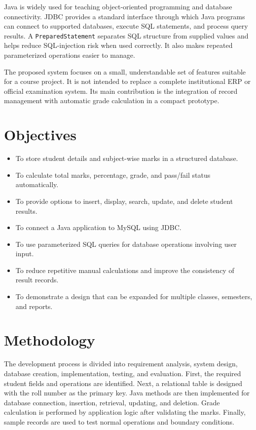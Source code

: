\documentclass[11pt,a4paper]{report}
\begin{document}
Java is widely used for teaching object-oriented programming and database connectivity. JDBC provides a standard interface through which Java programs can connect to supported databases, execute SQL statements, and process query results. A \texttt{PreparedStatement} separates SQL structure from supplied values and helps reduce SQL-injection risk when used correctly. It also makes repeated parameterized operations easier to manage.

The proposed system focuses on a small, understandable set of features suitable for a course project. It is not intended to replace a complete institutional ERP or official examination system. Its main contribution is the integration of record management with automatic grade calculation in a compact prototype.

\section{Objectives}
\begin{itemize}
\item To store student details and subject-wise marks in a structured database.
\item To calculate total marks, percentage, grade, and pass/fail status automatically.
\item To provide options to insert, display, search, update, and delete student results.
\item To connect a Java application to MySQL using JDBC.
\item To use parameterized SQL queries for database operations involving user input.
\item To reduce repetitive manual calculations and improve the consistency of result records.
\item To demonstrate a design that can be expanded for multiple classes, semesters, and reports.
\end{itemize}

\section{Methodology}
The development process is divided into requirement analysis, system design, database creation, implementation, testing, and evaluation. First, the required student fields and operations are identified. Next, a relational table is designed with the roll number as the primary key. Java methods are then implemented for database connection, insertion, retrieval, updating, and deletion. Grade calculation is performed by application logic after validating the marks. Finally, sample records are used to test normal operations and boundary conditions.
\end{document}

